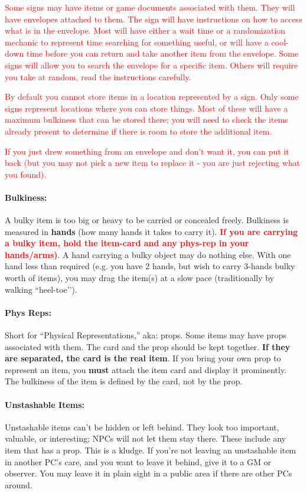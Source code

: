 \documentclass[sheet]{GL2020}
\begin{document}
\textcolor{red}{Some signs may have items or game documents associated with them. They will have envelopes attached to them. The sign will have instructions on how to access what is in the envelope. Most will have either a wait time or a randomization mechanic to represent time searching for something useful, or will have a cool-down time before you can return and take another item from the envelope. Some signs will allow you to search the envelope for a specific item. Others will require you take at random, read the instructions carefully.}

\textcolor{red}{By default you cannot store items in a location represented by a sign. Only some signs represent locations where you can store things. Most of these will have a maximum bulkiness that can be stored there; you will need to check the items already present to determine if there is room to store the additional item.}

\textcolor{red}{If you just drew something from an envelope and don't want it, you can put it back (but you may not pick a new item to replace it - you are just rejecting what you found).}

\paragraph{Bulkiness:} A bulky item is too big or heavy to be carried or concealed freely.  Bulkiness is measured in {\bf hands} (how many hands it takes to carry it).  \textcolor{red}{\textbf{If you are carrying a bulky item, hold the item-card and any phys-rep in your hands/arms)}}.  A hand carrying a bulky object may do nothing else.  With one hand less than required (e.g. you have 2 hands, but wish to carry 3-hands bulky worth of items), you may drag the item(s) at a slow pace (traditionally by walking ``heel-toe'’).

\paragraph{Phys Reps:} Short for ``Physical Representations,'' aka: props. Some items may have props associated with them.  The card and the prop should be kept together. \textbf{If they are separated, the card is the real item}. If you bring your own prop to represent an item, you \textbf{must} attach the item card and display it prominently. The bulkiness of the item is defined by the card, not by the prop.

\paragraph{Unstashable Items:} Unstashable items can't be hidden or left behind. They look too important, valuable, or interesting; NPCs will not let them stay there. These include any item that has a prop. This is a kludge. If you're not leaving an unstashable item in another PC's care, and you want to leave it behind, give it to a GM or observer. You may leave it in plain sight in a public area if there are other PCs around.
\end{document}
